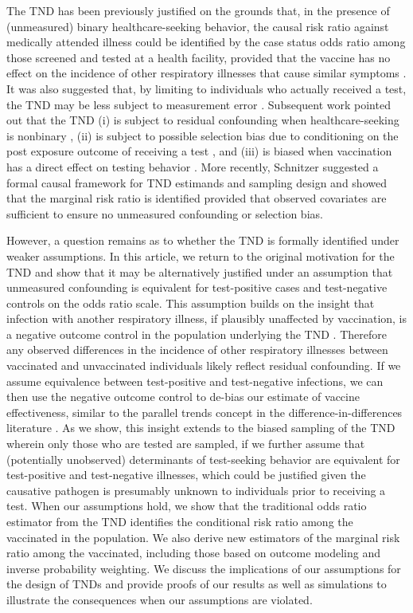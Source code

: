 \documentclass[11pt]{article}
\begin{document}
The TND has been previously justified on the grounds that, in the presence of (unmeasured) binary healthcare-seeking behavior, the causal risk ratio against medically attended illness could be identified by the case status odds ratio among those screened and tested at a health facility, provided that the vaccine has no effect on the incidence of other respiratory illnesses that cause similar symptoms \cite{jackson_test-negative_2013}. It was also suggested that, by limiting to individuals who actually received a test, the TND may be less subject to measurement error \cite{jackson_test-negative_2013}. Subsequent work pointed out that the TND (i) is subject to residual confounding when healthcare-seeking is nonbinary \cite{sullivan_theoretical_2016,lewnard_theoretical_2021}, (ii) is subject to possible selection bias due to conditioning on the post exposure outcome of receiving a test \cite{sullivan_theoretical_2016}, and (iii) is biased when vaccination has a direct effect on testing behavior \cite{foppa_case_2013}. More recently, Schnitzer \cite{schnitzer_estimands_2022} suggested a formal causal framework for TND estimands and sampling design and showed that the marginal risk ratio is identified provided that observed covariates are sufficient to ensure no unmeasured confounding or selection bias. 

However, a question remains as to whether the TND is formally identified under weaker assumptions. In this article, we return to the original motivation for the TND and show that it may be alternatively justified under an assumption that unmeasured confounding is equivalent for test-positive cases and test-negative controls on the odds ratio scale. This assumption builds on the insight that infection with another respiratory illness, if plausibly unaffected by vaccination, is a negative outcome control in the population underlying the TND \cite{lipsitch_negative_2010,shi_selective_2020}. Therefore any observed differences in the incidence of other respiratory illnesses between vaccinated and unvaccinated individuals likely reflect residual confounding. If we assume equivalence between test-positive and test-negative infections, we can then use the negative outcome control to de-bias our estimate of vaccine effectiveness, similar to the parallel trends concept in the difference-in-differences literature \cite{sofer_negative_2016,park_universal_2023,tchetgen_universal_2023}. As we show, this insight extends to the biased sampling of the TND wherein only those who are tested are sampled, if we further assume that (potentially unobserved) determinants of test-seeking behavior are equivalent for test-positive and test-negative illnesses, which could be justified given the causative pathogen is presumably unknown to individuals prior to receiving a test. When our assumptions hold, we show that the traditional odds ratio estimator from the TND identifies the conditional risk ratio among the vaccinated in the population. We also derive new estimators of the marginal risk ratio among the vaccinated, including those based on outcome modeling and inverse probability weighting. We discuss the implications of our assumptions for the design of TNDs and provide proofs of our results as well as simulations to illustrate the consequences when our assumptions are violated.
\end{document}
